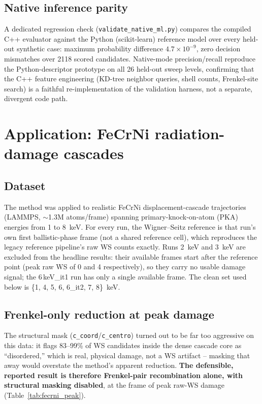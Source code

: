 \documentclass[11pt]{article}
\newcommand{\code}[1]{\texttt{#1}}
\begin{document}
\subsection{Native inference parity}

A dedicated regression check (\code{validate\_native\_ml.py}) compares the compiled C++ evaluator
against the Python (scikit-learn) reference model over every held-out synthetic case: maximum
probability difference $4.7\times10^{-9}$, zero decision mismatches over 2118 scored candidates.
Native-mode precision/recall reproduce the Python-descriptor prototype on all 26 held-out
sweep levels, confirming that the C++ feature engineering (KD-tree neighbor queries, shell counts,
Frenkel-site search) is a faithful re-implementation of the validation harness, not a separate,
divergent code path.

\section{Application: FeCrNi radiation-damage cascades}

\subsection{Dataset}

The method was applied to realistic FeCrNi displacement-cascade trajectories (LAMMPS,
$\sim$1.3M atoms/frame) spanning primary-knock-on-atom (PKA) energies from 1 to 8~keV. For every
run, the Wigner--Seitz reference is that run's own first ballistic-phase frame (not a shared
reference cell), which reproduces the legacy reference pipeline's raw WS counts exactly. Runs
2~keV and 3~keV are excluded from the headline results: their available frames start after the
reference point (peak raw WS of 0 and 4 respectively), so they carry no usable damage signal; the
6\,keV\_it1 run has only a single available frame. The clean set used below is
\{1, 4, 5, 6, 6\_it2, 7, 8\}~keV.

\subsection{Frenkel-only reduction at peak damage}

The structural mask (\code{c\_coord}/\code{c\_centro}) turned out to be far too aggressive on this
data: it flags 83--99\% of WS candidates inside the dense cascade core as ``disordered,'' which is
real, physical damage, not a WS artifact -- masking that away would overstate the method's
apparent reduction. \textbf{The defensible, reported result is therefore Frenkel-pair recombination
alone, with structural masking disabled}, at the frame of peak raw-WS damage
(Table~\ref{tab:fecrni_peak}).
\end{document}
